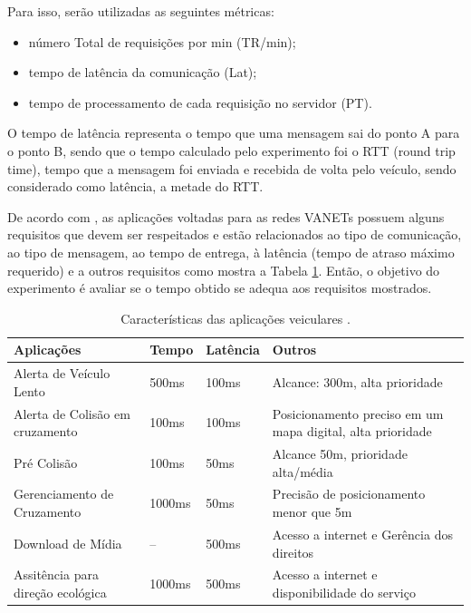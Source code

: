 \documentclass[
	12pt,				%
	oneside,			%
	a4paper,			%
	english,			%
	brazil				%
	]{abntex2ppgsi}
\begin{document}
Para isso, serão utilizadas as seguintes métricas: 
\begin{itemize}
	\item {número Total de requisições por min (TR/min);}
	\item {tempo de latência da comunicação (Lat);}
	\item {tempo de processamento de cada requisição no servidor (PT).}
\end{itemize} 

O tempo de latência representa o tempo que uma mensagem sai do ponto A para o ponto B, sendo que o tempo calculado pelo experimento foi o RTT (round trip time), tempo que a mensagem foi enviada e recebida de volta pelo veículo, sendo considerado como latência, a metade do RTT.

De acordo com ,  as aplicações voltadas para as redes VANETs possuem alguns requisitos que devem ser respeitados e estão relacionados ao tipo de comunicação, ao tipo de mensagem, ao tempo de entrega, à latência (tempo de atraso máximo requerido)  e a outros requisitos como mostra a Tabela \ref{tab:caracteristiasAppVanet}. Então, o objetivo do experimento é avaliar se o tempo obtido se adequa aos requisitos mostrados.


\begin{table}[!h]
	\centering
	\caption{Características das aplicações veiculares \cite{papadimitratos2008secure}.} 
	\label{tab:caracteristiasAppVanet}
	\begin{tabular}{|p{6cm}|p{1.5cm}|p{1.7cm}|p{4.0cm}|}
		\hline
		\rowcolor[gray]{0.7}
		Aplicações	& Tempo & Latência & Outros \\ \hline
		Alerta de Veículo Lento	&  500ms & 100ms & Alcance: 300m, alta prioridade \\ \hline
		
		Alerta de Colisão em cruzamento	 & 100ms & 100ms & Posicionamento preciso em um mapa digital, alta prioridade \\ \hline		
		
		Pré Colisão	&  100ms & 50ms & Alcance 50m, prioridade alta/média \\ \hline				
		Gerenciamento de Cruzamento	&  1000ms & 50ms & Precisão de posicionamento menor que  5m \\ \hline				
		Download de Mídia	& -- & 500ms & Acesso a internet e Gerência dos direitos \\ \hline						
		Assitência para direção ecológica	&  1000ms & 500ms & Acesso a internet e disponibilidade do serviço \\ \hline								
	\end{tabular}
\end{table}
\end{document}
